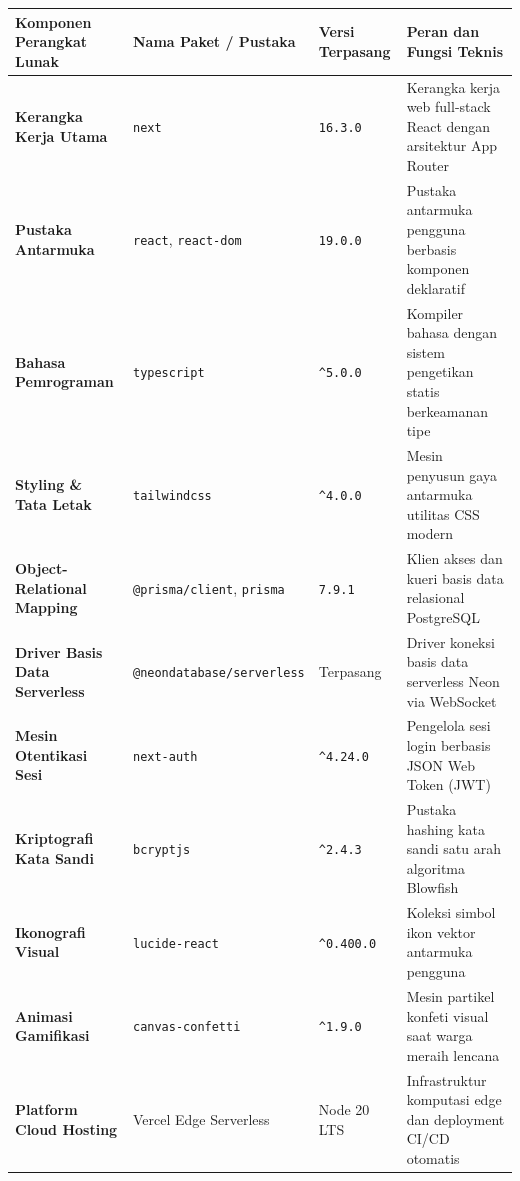 \documentclass[
  indonesian,
  12pt,
]{report}
\newcounter{none} %
\begin{document}
{\def\LTcaptype{none} %
\begin{longtable}[]{@{}
  >{\raggedright\arraybackslash}p{}
  >{\raggedright\arraybackslash}p{}
  >{\centering\arraybackslash}p{}
  >{\raggedright\arraybackslash}p{}@{}}
\toprule\noalign{}
\begin{minipage}[b]{\linewidth}\raggedright
Komponen Perangkat Lunak
\end{minipage} & \begin{minipage}[b]{\linewidth}\raggedright
Nama Paket / Pustaka
\end{minipage} & \begin{minipage}[b]{\linewidth}\centering
Versi Terpasang
\end{minipage} & \begin{minipage}[b]{\linewidth}\raggedright
Peran dan Fungsi Teknis
\end{minipage} \\
\midrule\noalign{}
\endhead
\bottomrule\noalign{}
\endlastfoot
\textbf{Kerangka Kerja Utama} & \texttt{next} & \texttt{16.3.0} &
Kerangka kerja web full-stack React dengan arsitektur App Router \\
\textbf{Pustaka Antarmuka} & \texttt{react}, \texttt{react-dom} &
\texttt{19.0.0} & Pustaka antarmuka pengguna berbasis komponen
deklaratif \\
\textbf{Bahasa Pemrograman} & \texttt{typescript} & \texttt{\^{}5.0.0} &
Kompiler bahasa dengan sistem pengetikan statis berkeamanan tipe \\
\textbf{Styling \& Tata Letak} & \texttt{tailwindcss} &
\texttt{\^{}4.0.0} & Mesin penyusun gaya antarmuka utilitas CSS
modern \\
\textbf{Object-Relational Mapping} & \texttt{@prisma/client},
\texttt{prisma} & \texttt{7.9.1} & Klien akses dan kueri basis data
relasional PostgreSQL \\
\textbf{Driver Basis Data Serverless} &
\texttt{@neondatabase/serverless} & Terpasang & Driver koneksi basis
data serverless Neon via WebSocket \\
\textbf{Mesin Otentikasi Sesi} & \texttt{next-auth} &
\texttt{\^{}4.24.0} & Pengelola sesi login berbasis JSON Web Token
(JWT) \\
\textbf{Kriptografi Kata Sandi} & \texttt{bcryptjs} & \texttt{\^{}2.4.3}
& Pustaka hashing kata sandi satu arah algoritma Blowfish \\
\textbf{Ikonografi Visual} & \texttt{lucide-react} &
\texttt{\^{}0.400.0} & Koleksi simbol ikon vektor antarmuka pengguna \\
\textbf{Animasi Gamifikasi} & \texttt{canvas-confetti} &
\texttt{\^{}1.9.0} & Mesin partikel konfeti visual saat warga meraih
lencana \\
\textbf{Platform Cloud Hosting} & Vercel Edge Serverless & Node 20 LTS &
Infrastruktur komputasi edge dan deployment CI/CD otomatis \\
\end{longtable}
}
\end{document}
